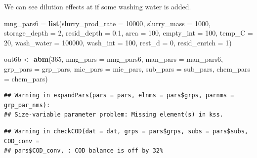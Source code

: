 \documentclass[
]{article}
\newenvironment{Shaded}{\begin{snugshade}}{\end{snugshade}}
\newcommand{\AttributeTok}[1]{\textcolor[rgb]{0.13,0.29,0.53}{#1}}
\newcommand{\DecValTok}[1]{\textcolor[rgb]{0.00,0.00,0.81}{#1}}
\newcommand{\FloatTok}[1]{\textcolor[rgb]{0.00,0.00,0.81}{#1}}
\newcommand{\FunctionTok}[1]{\textcolor[rgb]{0.13,0.29,0.53}{\textbf{#1}}}
\newcommand{\NormalTok}[1]{#1}
\newcommand{\OtherTok}[1]{\textcolor[rgb]{0.56,0.35,0.01}{#1}}
\begin{document}
We can see dilution effects at if some washing water is added.

\begin{Shaded}
\begin{Highlighting}[]
\NormalTok{mng\_pars6 }\OtherTok{=} \FunctionTok{list}\NormalTok{(}\AttributeTok{slurry\_prod\_rate =} \DecValTok{10000}\NormalTok{, }
                \AttributeTok{slurry\_mass =} \DecValTok{1000}\NormalTok{,     }
                \AttributeTok{storage\_depth =} \DecValTok{2}\NormalTok{,     }
                \AttributeTok{resid\_depth =} \FloatTok{0.1}\NormalTok{,      }
                \AttributeTok{area =} \DecValTok{100}\NormalTok{,              }
                \AttributeTok{empty\_int =} \DecValTok{100}\NormalTok{,          }
                \AttributeTok{temp\_C =} \DecValTok{20}\NormalTok{,}
                \AttributeTok{wash\_water =} \DecValTok{100000}\NormalTok{,            }
                \AttributeTok{wash\_int =} \DecValTok{100}\NormalTok{,}
                \AttributeTok{rest\_d =} \DecValTok{0}\NormalTok{,}
                \AttributeTok{resid\_enrich =} \DecValTok{1}\NormalTok{)}
\end{Highlighting}
\end{Shaded}

\begin{Shaded}
\begin{Highlighting}[]
\NormalTok{out6b }\OtherTok{\textless{}{-}} \FunctionTok{abm}\NormalTok{(}\DecValTok{365}\NormalTok{,}
            \AttributeTok{mng\_pars =}\NormalTok{ mng\_pars6,}
            \AttributeTok{man\_pars =}\NormalTok{ man\_pars6,}
            \AttributeTok{grp\_pars =}\NormalTok{ grp\_pars,}
            \AttributeTok{mic\_pars =}\NormalTok{ mic\_pars,}
            \AttributeTok{sub\_pars =}\NormalTok{ sub\_pars,}
            \AttributeTok{chem\_pars =}\NormalTok{ chem\_pars)}
\end{Highlighting}
\end{Shaded}

\begin{verbatim}
## Warning in expandPars(pars = pars, elnms = pars$grps, parnms = grp_par_nms):
## Size-variable parameter problem: Missing element(s) in kss.
\end{verbatim}

\begin{verbatim}
## Warning in checkCOD(dat = dat, grps = pars$grps, subs = pars$subs, COD_conv =
## pars$COD_conv, : COD balance is off by 32%
\end{verbatim}
\end{document}
